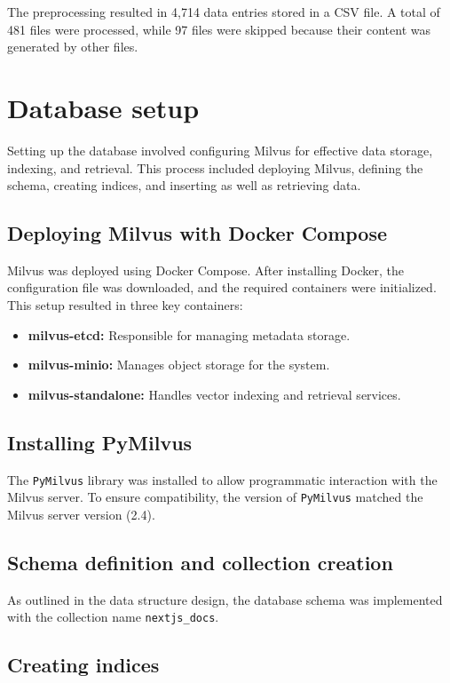 The preprocessing resulted in 4,714 data entries stored in a CSV file. A total of 481 files were processed, while 97 files were skipped because their content was generated by other files.

\section{Database setup}

Setting up the database involved configuring Milvus for effective data storage, indexing, and retrieval. This process included deploying Milvus, defining the schema, creating indices, and inserting as well as retrieving data.

\subsection{Deploying Milvus with Docker Compose}

Milvus was deployed using Docker Compose. After installing Docker, the configuration file was downloaded, and the required containers were initialized. This setup resulted in three key containers:
\begin{itemize}
	\item \textbf{milvus-etcd:} Responsible for managing metadata storage.
	\item \textbf{milvus-minio:} Manages object storage for the system.
	\item \textbf{milvus-standalone:} Handles vector indexing and retrieval services.
\end{itemize}

\subsection{Installing PyMilvus}

The \texttt{PyMilvus} library was installed to allow programmatic interaction with the Milvus server. To ensure compatibility, the version of \texttt{PyMilvus} matched the Milvus server version (2.4).

\subsection*{Schema definition and collection creation}

As outlined in the data structure design, the database schema was implemented with the collection name \texttt{nextjs\_docs}.

\subsection{Creating indices}

